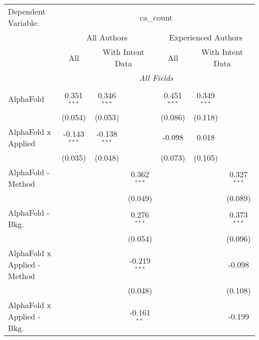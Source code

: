\begingroup
\centering
\begin{tabular}{lcccccc}
   \tabularnewline \midrule \midrule
   Dependent Variable: & \multicolumn{6}{c}{ca\_count}\\
 & \multicolumn{3}{c}{All Authors} & \multicolumn{3}{c}{Experienced Authors} \\
\cmidrule(lr){2-4} \cmidrule(lr){5-7}
 & \multicolumn{1}{c}{All} & \multicolumn{2}{c}{With Intent Data} & \multicolumn{1}{c}{All} & \multicolumn{2}{c}{With Intent Data} \\
\cmidrule(lr){2-2} \cmidrule(lr){3-4} \cmidrule(lr){5-5} \cmidrule(lr){6-7}
 & \multicolumn{6}{c}{\textit{All Fields}} \\ \\
   AlphaFold                      & 0.351$^{***}$  & 0.346$^{***}$  &                & 0.451$^{***}$  & 0.349$^{***}$ &   \\   
                                  & (0.054)        & (0.053)        &                & (0.086)        & (0.118)       &   \\   
   AlphaFold x Applied            & -0.143$^{***}$ & -0.138$^{***}$ &                & -0.098         & 0.018         &   \\   
                                  & (0.035)        & (0.048)        &                & (0.073)        & (0.105)       &   \\   
   AlphaFold - Method             &                &                & 0.362$^{***}$  &                &               & 0.327$^{***}$\\   
                                  &                &                & (0.049)        &                &               & (0.089)\\   
   AlphaFold - Bkg.               &                &                & 0.276$^{***}$  &                &               & 0.373$^{***}$\\   
                                  &                &                & (0.054)        &                &               & (0.096)\\   
   AlphaFold x Applied - Method   &                &                & -0.219$^{***}$ &                &               & -0.098\\   
                                  &                &                & (0.048)        &                &               & (0.108)\\   
   AlphaFold x Applied - Bkg.     &                &                & -0.161$^{**}$  &                &               & -0.199\\   

\end{tabular}
